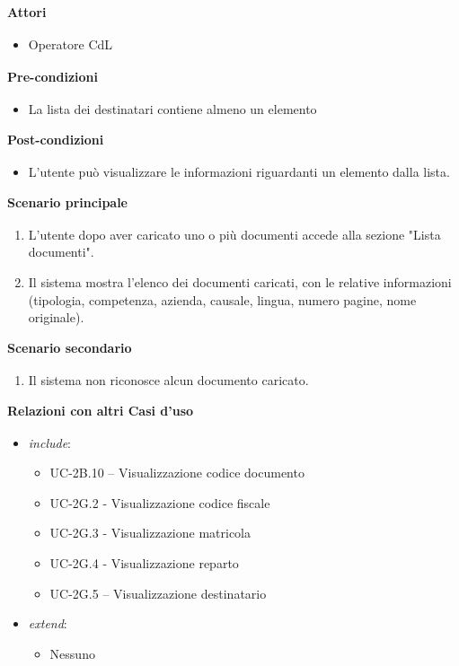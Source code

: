 ﻿\documentclass[a4paper,11pt]{article}
\begin{document}
\textbf{Attori\textsubscript{}}
\begin{itemize}
    \item Operatore CdL\textsubscript{}
\end{itemize}


\textbf{Pre-condizioni\textsubscript{}}
\begin{itemize}
    \item La lista dei destinatari contiene almeno un elemento
\end{itemize}


\textbf{Post-condizioni\textsubscript{}}
\begin{itemize}
    \item L'utente può visualizzare le informazioni riguardanti un elemento dalla lista.
\end{itemize}

\textbf{Scenario principale\textsubscript{}}
\begin{enumerate}
    \item L'utente dopo aver caricato uno o più documenti accede alla sezione "Lista documenti".
    \item Il sistema mostra l'elenco dei documenti caricati, con le relative informazioni (tipologia, competenza, azienda, causale, lingua, numero pagine, nome originale).
\end{enumerate}

\textbf{Scenario secondario\textsubscript{}}
\begin{enumerate}
    \item Il sistema non riconosce alcun documento caricato.
\end{enumerate}

\textbf{Relazioni con altri Casi d'uso\textsubscript{}}
\begin{itemize}
    \item \textit{include}: 
    \begin{itemize}
        \item UC-2B.10 – Visualizzazione codice documento
        \item UC-2G.2 - Visualizzazione codice fiscale
        \item UC-2G.3 - Visualizzazione matricola
        \item UC-2G.4 - Visualizzazione reparto
        \item UC-2G.5 – Visualizzazione destinatario
    \end{itemize}
    \item \textit{extend}: 
    \begin{itemize}
        \item Nessuno
    \end{itemize}
\end{itemize}
\end{document}
